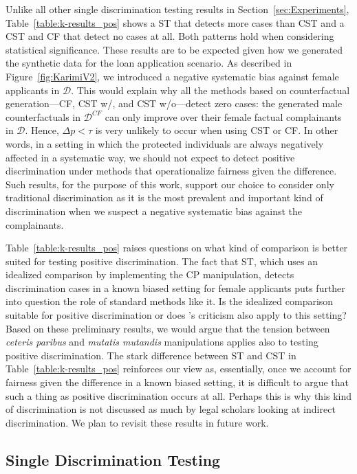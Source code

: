 Unlike all other single discrimination testing results in Section~\ref{sec:Experiments}, Table~\ref{table:k-results_pos} shows a ST that detects more cases than CST and a CST and CF that detect no cases at all. 
Both patterns hold when considering statistical significance.
These results are to be expected given how we generated the synthetic data for the loan application scenario. 
As described in Figure~\ref{fig:KarimiV2}, we introduced a negative systematic bias against female applicants in $\mathcal{D}$. 
This would explain why all the methods based on counterfactual generation---CF, CST w/, and CST w/o---detect zero cases: the generated male counterfactuals in $\mathcal{D}^{CF}$ can only improve over their female factual complainants in $\mathcal{D}$.
Hence, $\Delta p < \tau$ is very unlikely to occur when using CST or CF.
In other words, in a setting in which the protected individuals are always negatively affected in a systematic way, we should not expect to detect positive discrimination under methods that operationalize fairness given the difference.
Such results, for the purpose of this work, support our choice to consider only traditional discrimination as it is the most prevalent and important kind of discrimination when we suspect a negative systematic bias against the complainants. 

Table~\ref{table:k-results_pos} raises questions on what kind of comparison is better suited for testing positive discrimination. 
The fact that ST, which uses an idealized comparison by implementing the CP manipulation, detects discrimination cases in a known biased setting for female applicants puts further into question the role of standard methods like it.
Is the idealized comparison suitable for positive discrimination or does \textcite{Kohler2018CausalEddie}'s criticism also apply to this setting?
Based on these preliminary results, we would argue that the tension between \textit{ceteris paribus} and \textit{mutatis mutandis} manipulations applies also to testing positive discrimination.
The stark difference between ST and CST in Table~\ref{table:k-results_pos} reinforces our view as, essentially, once we account for fairness given the difference in a known biased setting, it is difficult to argue that such a thing as positive discrimination occurs at all. 
Perhaps this is why this kind of discrimination is not discussed as much by legal scholars looking at indirect discrimination.
We plan to revisit these results in future work.

\subsection{Single Discrimination Testing}


